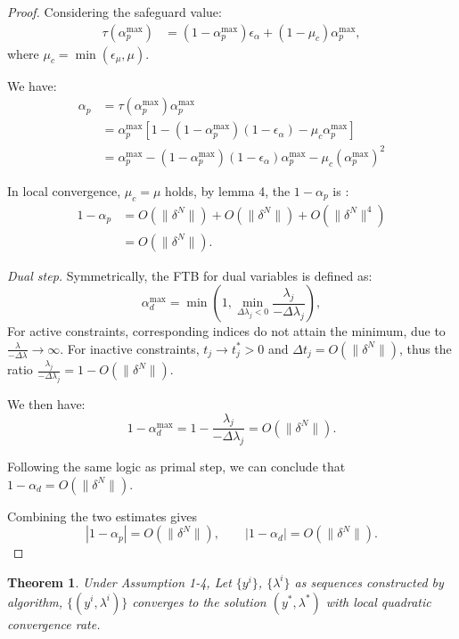 \documentclass[conference]{IEEEtran}
\theoremstyle{plain}
\newtheorem{theorem}{Theorem}
\begin{document}
\begin{proof}
Considering the safeguard value:
\begin{align*}
    \tau(\alpha_p^{\max}) &= (1-\alpha_p^{\max}) \epsilon_\alpha + (1 - \mu_c) \alpha_p^{\max},
\end{align*}
where $\mu_c = \min(\epsilon_\mu, \mu)$.

We have:
\begin{align*}
    \alpha_p &= \tau(\alpha_p^{\max}) \alpha_p^{\max} \\
             &= \alpha_p^{\max}[1-(1-\alpha_p^{\max})(1-\epsilon_\alpha) - \mu_c\alpha_p^{\max}] \\
             &= \alpha_p^{\max} - (1-\alpha_p^{\max})(1-\epsilon_\alpha)\alpha_p^{\max} - \mu_c(\alpha_p^{\max})^2
\end{align*}

In local convergence, $\mu_c = \mu$ holds, by lemma 4, the $1 - \alpha_p$ is :
\begin{align*}
    1 - \alpha_p &= O(\|\delta^N\|) + O(\|\delta^N\|) + O(\|\delta^N\|^4) \\
                 &= O(\|\delta^N\|).
\end{align*}

\emph{Dual step.}
Symmetrically, the FTB for dual variables is defined as:
\begin{equation*}
    \alpha_d^{\max} = \min\left(1, \min_{\Delta \lambda_j < 0} \frac{\lambda_j}{-\Delta \lambda_j}\right),
\end{equation*}
For active constraints, corresponding indices do not attain the minimum, due to $\frac{\lambda}{-\Delta \lambda} \rightarrow \infty$.
For inactive constraints, $t_j \rightarrow t_j^* > 0$ and $\Delta t_j = O(\|\delta^N\|)$, 
thus the ratio $\frac{\lambda_j}{-\Delta \lambda_j} = 1 - O(\|\delta^N \|)$.

We then have:
\begin{equation*}
    1 - \alpha_d^{\max} =  1 - \frac{\lambda_j}{-\Delta \lambda_j} = O(\|\delta^N\|).
\end{equation*}

Following the same logic as primal step, we can conclude that $1 - \alpha_d = O(\|\delta^N\|)$.

Combining the two estimates gives 
\begin{equation*}
    |1-\alpha_p| = O(\|\delta^N\|), \qquad |1-\alpha_d| = O(\|\delta^N\|).
\end{equation*}
\end{proof}

\begin{theorem}
    Under Assumption 1-4, Let $\{y^i\}$, $\{\lambda^i\}$ as sequences constructed by algorithm, 
    $\{(y^i, \lambda^i)\}$ converges to the solution $(y^*, \lambda^*)$ with local quadratic convergence rate.
\end{theorem}
\end{document}
